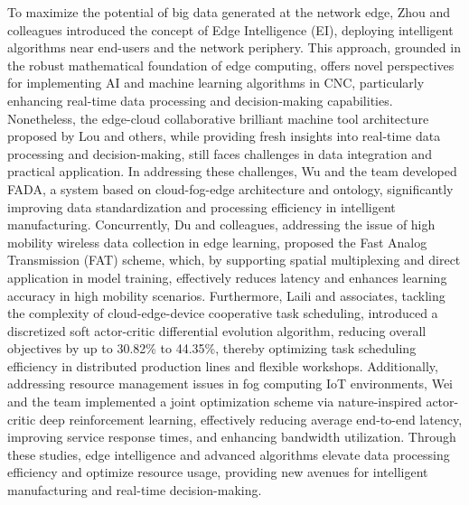 \documentclass[preprint,12pt]{elsarticle}
\begin{document}
To maximize the potential of big data generated at the network edge, Zhou and colleagues introduced the concept of Edge Intelligence (EI), deploying intelligent algorithms near end-users and the network periphery\cite{zhou2019edge}. This approach, grounded in the robust mathematical foundation of edge computing, offers novel perspectives for implementing AI and machine learning algorithms in CNC, particularly enhancing real-time data processing and decision-making capabilities. Nonetheless, the edge-cloud collaborative brilliant machine tool architecture proposed by Lou and others\cite{lou2020intelligent}, while providing fresh insights into real-time data processing and decision-making, still faces challenges in data integration and practical application\cite{liu2020wireless,xu2020edge}. In addressing these challenges, Wu and the team developed FADA, a system based on cloud-fog-edge architecture and ontology, significantly improving data standardization and processing efficiency in intelligent manufacturing\cite{wu2020fada}. Concurrently, Du and colleagues, addressing the issue of high mobility wireless data collection in edge learning, proposed the Fast Analog Transmission (FAT) scheme, which, by supporting spatial multiplexing and direct application in model training, effectively reduces latency and enhances learning accuracy in high mobility scenarios\cite{du2018fast}. Furthermore, Laili and associates, tackling the complexity of cloud-edge-device cooperative task scheduling, introduced a discretized soft actor-critic differential evolution algorithm, reducing overall objectives by up to 30.82\% to 44.35\%, thereby optimizing task scheduling efficiency in distributed production lines and flexible workshops\cite{laili2023dsac}. Additionally, addressing resource management issues in fog computing IoT environments, Wei and the team implemented a joint optimization scheme via nature-inspired actor-critic deep reinforcement learning, effectively reducing average end-to-end latency, improving service response times, and enhancing bandwidth utilization\cite{wei2018joint}. Through these studies, edge intelligence and advanced algorithms elevate data processing efficiency and optimize resource usage, providing new avenues for intelligent manufacturing and real-time decision-making.
\end{document}
